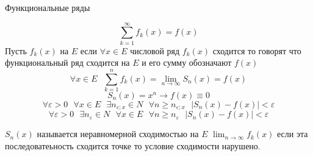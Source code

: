 \begin{title}
  Функциональные ряды
\end{title}

$$
\sum_{k=1}^{\infty} f_k (x) = f(x)
$$
Пусть $f_k(x)$ на $E$ если $\forall x \in E$ числовой ряд $f_k(x)$ сходится то
говорят что функциональный ряд сходится на $E$ и его сумму обозначают $f(x)$
$$
\forall x \in E ~~~ \sum_{k=1}^n f_k(x) = \lim_{n \to \infty} S_n(x) = f(x)
$$
$$
S_n(x) = x^n \to f(x) \equiv 0
$$
$$
\forall \varepsilon > 0 ~~~ \forall x \in E ~~~ \exists n_{\varepsilon; x} \in N
~~~ \forall n \ge n_{\varepsilon; x} ~~~ \left| S_n(x) - f(x) \right|
< \varepsilon
$$
$$
\forall \varepsilon > 0 ~~~ \exists n_{\varepsilon} \in N ~~~ \forall x \in E
~~~ \forall n \ge n_{\varepsilon} ~~~ |S_n (x) - f(x)| < \varepsilon
$$

$S_n(x)$ называется неравномерной сходимостью на $E$
$\lim_{n \to \infty} f_k(x)$ если эта последоватеьность сходится точке то
условие сходимости нарушено.